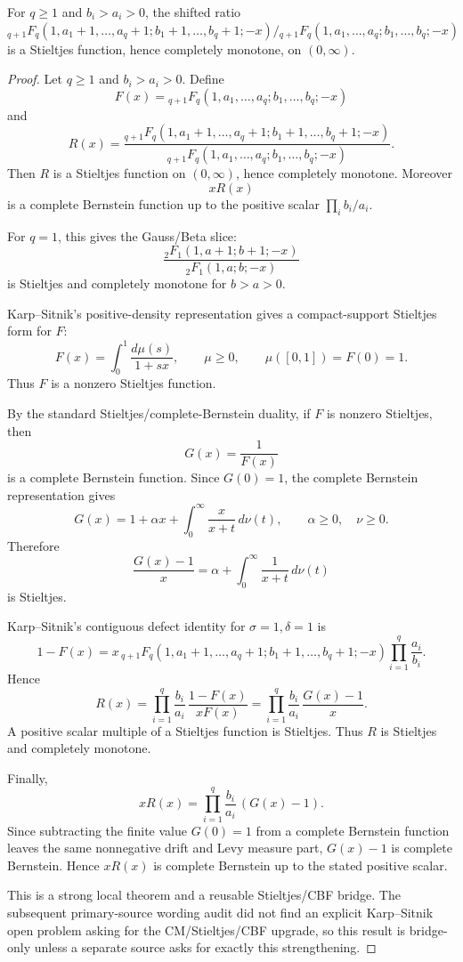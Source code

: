 \begin{lemma}
\label{res:ks-general-q-delta1-sigma1-ratio-stieltjes-cm}
For \(q\ge1\) and \(b_i>a_i>0\), the shifted ratio \({}_{q+1}F_q(1,a_1+1,\ldots,a_q+1;b_1+1,\ldots,b_q+1;-x)/{}_{q+1}F_q(1,a_1,\ldots,a_q;b_1,\ldots,b_q;-x)\) is a Stieltjes function, hence completely monotone, on \((0,\infty)\).
\end{lemma}
\begin{proof}
Let \(q\ge1\) and \(b_i>a_i>0\). Define
\[
F(x)={}_{q+1}F_q(1,a_1,\ldots,a_q;b_1,\ldots,b_q;-x)
\]
and
\[
R(x)=
\frac{{}_{q+1}F_q(1,a_1+1,\ldots,a_q+1;b_1+1,\ldots,b_q+1;-x)}
{{}_{q+1}F_q(1,a_1,\ldots,a_q;b_1,\ldots,b_q;-x)}.
\]
Then \(R\) is a Stieltjes function on \((0,\infty)\), hence completely monotone. Moreover
\[
xR(x)
\]
is a complete Bernstein function up to the positive scalar \(\prod_i b_i/a_i\).

For \(q=1\), this gives the Gauss/Beta slice:
\[
\frac{{}_2F_1(1,a+1;b+1;-x)}{{}_2F_1(1,a;b;-x)}
\]
is Stieltjes and completely monotone for \(b>a>0\).

Karp--Sitnik's positive-density representation gives a compact-support Stieltjes form for \(F\):
\[
F(x)=\int_0^1 \frac{d\mu(s)}{1+sx},
\qquad \mu\ge0,
\qquad \mu([0,1])=F(0)=1.
\]
Thus \(F\) is a nonzero Stieltjes function.

By the standard Stieltjes/complete-Bernstein duality, if \(F\) is nonzero Stieltjes, then
\[
G(x)=\frac1{F(x)}
\]
is a complete Bernstein function. Since \(G(0)=1\), the complete Bernstein representation gives
\[
G(x)=1+\alpha x+\int_0^\infty \frac{x}{x+t}\,d\nu(t),
\qquad \alpha\ge0,\quad \nu\ge0.
\]
Therefore
\[
\frac{G(x)-1}{x}
=\alpha+\int_0^\infty \frac{1}{x+t}\,d\nu(t)
\]
is Stieltjes.

Karp--Sitnik's contiguous defect identity for \(\sigma=1,\delta=1\) is
\[
1-F(x)
=x\,{}_{q+1}F_q(1,a_1+1,\ldots,a_q+1;b_1+1,\ldots,b_q+1;-x)
\prod_{i=1}^q\frac{a_i}{b_i}.
\]
Hence
\[
R(x)=
\prod_{i=1}^q\frac{b_i}{a_i}\,
\frac{1-F(x)}{xF(x)}
=
\prod_{i=1}^q\frac{b_i}{a_i}\,
\frac{G(x)-1}{x}.
\]
A positive scalar multiple of a Stieltjes function is Stieltjes. Thus \(R\) is Stieltjes and completely monotone.

Finally,
\[
xR(x)=\prod_{i=1}^q\frac{b_i}{a_i}\,(G(x)-1).
\]
Since subtracting the finite value \(G(0)=1\) from a complete Bernstein function leaves the same nonnegative drift and Levy measure part, \(G(x)-1\) is complete Bernstein. Hence \(xR(x)\) is complete Bernstein up to the stated positive scalar.

This is a strong local theorem and a reusable Stieltjes/CBF bridge. The subsequent primary-source wording audit did not find an explicit Karp--Sitnik open problem asking for the CM/Stieltjes/CBF upgrade, so this result is bridge-only unless a separate source asks for exactly this strengthening.
\end{proof}

